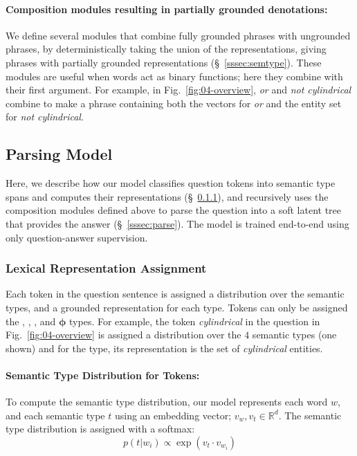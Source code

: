 \documentclass[main.tex]{subfiles}
\begin{document}
\paragraph{Composition modules resulting in partially grounded denotations:} We define several modules that combine fully grounded phrases with ungrounded phrases, by deterministically taking the union of the representations, giving phrases with partially grounded representations (\S~\ref{sssec:semtype}). These modules are useful when words act as binary functions; here they combine with their first argument. For example, in Fig.~\ref{fig:04-overview}, \emph{or} and \emph{not cylindrical} combine to make a phrase containing both the vectors for \emph{or} and the entity set for \emph{not cylindrical}.


\subsection{Parsing Model}
\label{ssec:parsing}
Here, we describe how our model classifies question tokens into semantic type spans and computes their representations (\S~\ref{sssec:leaf}), and recursively uses the composition modules defined above to parse the question into a soft latent tree that provides the answer (\S~\ref{sssec:parse}). The model is trained end-to-end using only question-answer supervision.


\subsubsection{Lexical Representation Assignment}
\label{sssec:leaf}
Each token in the question sentence is assigned a distribution over the semantic types, and a grounded representation for each type. Tokens can only be assigned the , , , and $\pmb{\phi}$ types.
For example, the token \emph{cylindrical} in the question in Fig.~\ref{fig:04-overview} is assigned a distribution over the $4$ semantic types (one shown) and for the  type, its representation is the set of \textit{cylindrical} entities.

\paragraph{Semantic Type Distribution for Tokens:} To compute the semantic type distribution, our model represents each word $w$, and each semantic type $t$ using an embedding vector; $v_{w}, v_{t} \in \mathbb{R}^{d}$. The semantic type distribution is assigned with a softmax:
\begin{equation*}
    p(t|w_{i}) \propto \exp({v_{t}\cdot v_{w_{i}}})
    \label{eq:wordtypdist}
\end{equation*}
\end{document}
